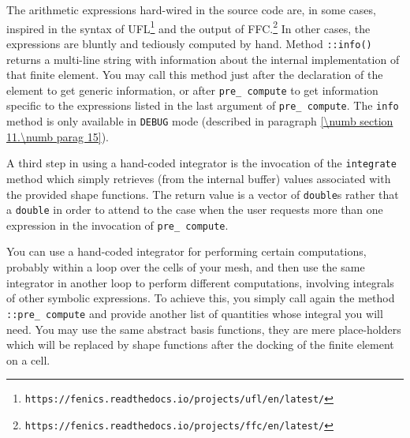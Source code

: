 The arithmetic expressions hard-wired in the source code are, in some cases, inspired
in the syntax of UFL\footnote {{} \small\tt https://fenics.readthedocs.io/projects/ufl/en/latest/}
and the output of FFC.\footnote {{} \small\tt https://fenics.readthedocs.io/projects/ffc/en/latest/}
In other cases, the expressions are bluntly and tediously computed by hand.
Method {\small\tt{}::info()} returns a multi-line string with information
about the internal implementation of that finite element.
You may call this method just after the declaration of the element to get generic information,
or after {\small\tt pre\_\,compute} to get information specific to the expressions
listed in the last argument of {\small\tt pre\_\,compute}.
The {\small\tt info} method is only available in {\small\tt DEBUG} mode (described in paragraph
\ref{\numb section 11.\numb parag 15}).

A third step in using a hand-coded integrator is the invocation of the
{\small\tt integrate} method which simply retrieves (from the internal buffer) values 
associated with the provided shape functions.
The return value is a vector of {\small\tt double}s rather that a {\small\tt double}
in order to attend to the case when the user requests more than one expression
in the invocation of {\small\tt pre\_\,compute}.

You can use a hand-coded integrator for performing certain computations,
probably within a loop over the cells of your mesh, and then use the same integrator in another loop
to perform different computations, involving integrals of other symbolic expressions.
To achieve this, you simply call again the method {\small\tt{}::pre\_\,compute}
and provide another list of quantities whose integral you will need.
You may use the same abstract basis functions, they are mere place-holders which will be replaced
by shape functions after the docking of the finite element on a cell.
